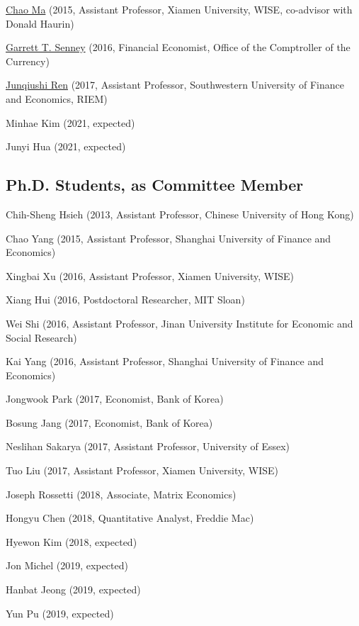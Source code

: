 \documentclass[10pt,letterpaper]{article}
\renewenvironment{itemize}{
  \begin{list}{}{
      \setlength{\leftmargin}{1.5em}
      \setlength{\itemsep}{0.25em}
      \setlength{\parskip}{0pt}
      \setlength{\parsep}{0.25em}
    }
}{
  \end{list}
}
\begin{document}
\begin{itemize}
\item \href{http://chaoma2014.weebly.com}{Chao Ma} (2015, Assistant Professor, Xiamen University, WISE, co-advisor with Donald Haurin)
\item \href{http://garrettsenney.weebly.com}{Garrett T. Senney} (2016, Financial Economist, Office of the Comptroller of the Currency)
\item \href{http://junqiushi-ren.weebly.com}{Junqiushi Ren} (2017, Assistant Professor, Southwestern University of Finance and Economics, RIEM) %
\item Minhae Kim (2021, expected)
\item Junyi Hua (2021, expected)
\end{itemize}

\subsection*{Ph.D. Students, as Committee Member}

\begin{itemize}
\item Chih-Sheng Hsieh (2013, Assistant Professor, Chinese University of Hong Kong)
\item Chao Yang (2015, Assistant Professor, Shanghai University of Finance and Economics)
\item Xingbai Xu (2016, Assistant Professor, Xiamen University, WISE)
\item Xiang Hui (2016, Postdoctoral Researcher, MIT Sloan)
\item Wei Shi (2016, Assistant Professor, Jinan University Institute for Economic and Social Research)
\item Kai Yang (2016, Assistant Professor, Shanghai University of Finance and Economics)
\item Jongwook Park (2017, Economist, Bank of Korea)
\item Bosung Jang (2017, Economist, Bank of Korea)
\item Neslihan Sakarya (2017, Assistant Professor, University of Essex)
\item Tuo Liu (2017, Assistant Professor, Xiamen University, WISE)
\item Joseph Rossetti (2018, Associate, Matrix Economics)
\item Hongyu Chen (2018, Quantitative Analyst, Freddie Mac)
\item Hyewon Kim (2018, expected)
\item Jon Michel (2019, expected)
\item Hanbat Jeong (2019, expected)
\item Yun Pu (2019, expected)
\end{itemize}
\end{document}

